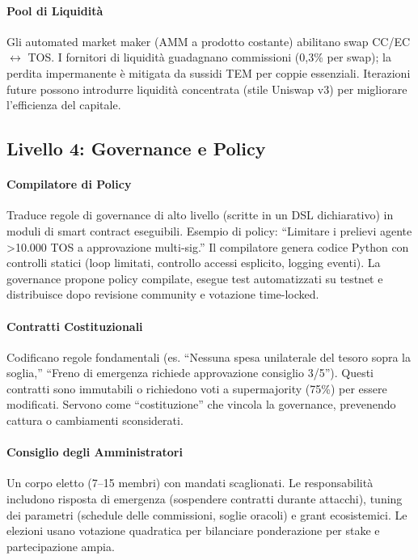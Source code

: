\documentclass[11pt]{article}
\begin{document}
\paragraph{Pool di Liquidità} Gli automated market maker (AMM a prodotto costante) abilitano swap CC/EC $\leftrightarrow$ TOS. I fornitori di liquidità guadagnano commissioni (0,3\% per swap); la perdita impermanente è mitigata da sussidi TEM per coppie essenziali. Iterazioni future possono introdurre liquidità concentrata (stile Uniswap v3) per migliorare l'efficienza del capitale.

\subsection{Livello 4: Governance e Policy}
\paragraph{Compilatore di Policy} Traduce regole di governance di alto livello (scritte in un DSL dichiarativo) in moduli di smart contract eseguibili. Esempio di policy: ``Limitare i prelievi agente >10.000 TOS a approvazione multi-sig.'' Il compilatore genera codice Python con controlli statici (loop limitati, controllo accessi esplicito, logging eventi). La governance propone policy compilate, esegue test automatizzati su testnet e distribuisce dopo revisione community e votazione time-locked.

\paragraph{Contratti Costituzionali} Codificano regole fondamentali (es. ``Nessuna spesa unilaterale del tesoro sopra la soglia,'' ``Freno di emergenza richiede approvazione consiglio 3/5''). Questi contratti sono immutabili o richiedono voti a supermajority (75\%) per essere modificati. Servono come ``costituzione'' che vincola la governance, prevenendo cattura o cambiamenti sconsiderati.

\paragraph{Consiglio degli Amministratori} Un corpo eletto (7--15 membri) con mandati scaglionati. Le responsabilità includono risposta di emergenza (sospendere contratti durante attacchi), tuning dei parametri (schedule delle commissioni, soglie oracoli) e grant ecosistemici. Le elezioni usano votazione quadratica per bilanciare ponderazione per stake e partecipazione ampia.
\end{document}
